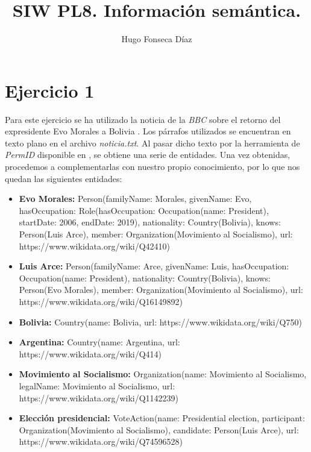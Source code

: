 \documentclass[11pt]{article}
\begin{document}
\title{SIW PL8. Información semántica.}
\author{Hugo Fonseca Díaz\\ }
\maketitle
\section{Ejercicio 1}
Para este ejercicio se ha utilizado la noticia de la \textit{BBC} sobre el retorno del expresidente Evo Morales a Bolivia \cite{bbcevomorales}. Los párrafos utilizados se encuentran en texto plano en el archivo \textit{noticia.txt}. Al pasar dicho texto por la herramienta de \textit{PermID} disponible en \cite{permidtool}, se obtiene una serie de entidades. Una vez obtenidas, procedemos a complementarlas con nuestro propio conocimiento, por lo que nos quedan las siguientes entidades:

\begin{itemize}
    \item \textbf{Evo Morales:} Person(familyName: Morales, givenName: Evo, hasOccupation: Role(hasOccupation: Occupation(name: President), startDate: 2006, endDate: 2019), nationality: Country(Bolivia), knows: Person(Luis Arce), member: Organization(Movimiento al Socialismo), url: https://www.wikidata.org/wiki/Q42410)
    \item \textbf{Luis Arce:} Person(familyName: Arce, givenName: Luis, hasOccupation: Occupation(name: President), nationality: Country(Bolivia), knows: Person(Evo Morales), member: Organization(Movimiento al Socialismo), url: https://www.wikidata.org/wiki/Q16149892)
    \item \textbf{Bolivia:} Country(name: Bolivia, url: https://www.wikidata.org/wiki/Q750)
    \item \textbf{Argentina:} Country(name: Argentina, url: https://www.wikidata.org/wiki/Q414)
    \item \textbf{Movimiento al Socialismo:} Organization(name: Movimiento al Socialismo, legalName: Movimiento al Socialismo, url: https://www.wikidata.org/wiki/Q1142239)
    \item \textbf{Elección presidencial:} VoteAction(name: Presidential election, participant: Organization(Movimiento al Socialismo), candidate: Person(Luis Arce), url: https://www.wikidata.org/wiki/Q74596528)
\end{itemize}
\end{document}
